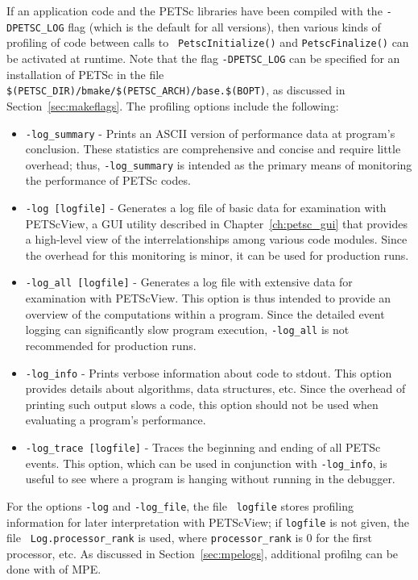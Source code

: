If an application code and the PETSc libraries have been compiled with
the {\tt -DPETSC\_LOG} flag (which is the default for all versions),
then various kinds of profiling of code between calls to {\tt
PetscInitialize()} and {\tt PetscFinalize()} can be 
activated at runtime.  Note that the flag {\tt -DPETSC\_LOG} can be
specified for an installation of PETSc in the file {\tt
\$(PETSC\_DIR)/bmake/\$(PETSC\_ARCH)/base.\$(BOPT)}, as discussed in
Section~\ref{sec:makeflags}.  The profiling options include the following:
   
\begin{itemize}
\item {\tt -log\_summary} - Prints an ASCII version of performance data
     at program's conclusion. These statistics are comprehensive and concise
     and require little overhead; thus, {\tt -log\_summary} is intended as
     the primary means of monitoring the performance of PETSc codes.
\item {\tt -log [logfile]} - Generates a log file of basic data for examination
     with PETScView, a GUI utility described in Chapter~\ref{ch:petsc_gui}
     that provides a high-level view of the interrelationships
     among various code modules.  Since the overhead for this monitoring is minor,
     it can be used for production runs.  
\item {\tt -log\_all [logfile]} - Generates a log file with extensive data
     for examination with PETScView.  This option is thus intended to
     provide an overview of the computations within a program.  Since the
     detailed event logging can significantly slow program execution, 
     {\tt -log\_all} is not recommended for production runs.
\item {\tt -log\_info} - Prints verbose information about code to stdout. 
     This option provides details about algorithms, data structures, etc.
     Since the overhead of printing such output slows a code, this
     option should not be used when evaluating a program's performance.
\item {\tt -log\_trace [logfile]} - Traces the beginning and ending of all
     PETSc events.  This option, which can be used in conjunction with 
     {\tt -log\_info}, is useful to see where a program is hanging
     without running in the debugger.  
\end{itemize}
For the options {\tt -log} and {\tt -log\_file}, the file {\tt
logfile} stores profiling information for later interpretation with
PETScView; if {\tt logfile} is not given, the file {\tt
Log.processor\_rank} is used, where {\tt processor\_rank} is 0 for the
first processor, etc.  As discussed in Section~\ref{sec:mpelogs},
additional profilng can be done with of MPE.

